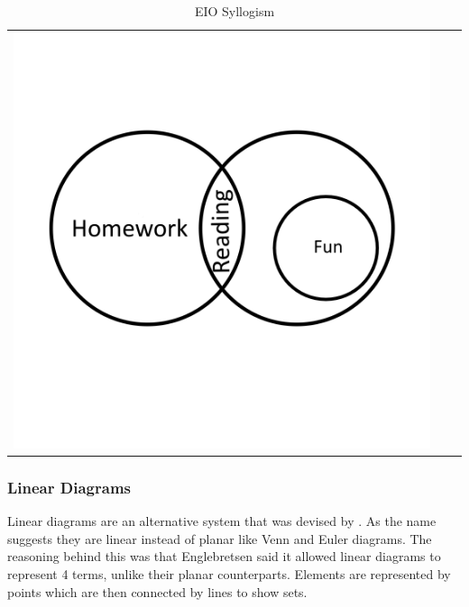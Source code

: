 \documentclass[12pt,a4paper]{report}
\begin{document}
\begin{table}[h!]
\begin{tabular}{  c  c  c }
\begin{minipage}{.22\textwidth}
      \includegraphics[width=\textwidth]{EulerSomeReadingIsNotFun3}
    \end{minipage}
    \\
  \end{tabular}
  \caption{EIO Syllogism}\label{tbl:eulerHomework}
\end{table}
\FloatBarrier


\subsubsection{Linear Diagrams}
Linear diagrams are an alternative system that was devised by \cite{englebretsen1991}. As the name suggests they are linear instead of planar like Venn and Euler diagrams. The reasoning behind this was that Englebretsen said it allowed linear diagrams to represent 4 terms, unlike their planar counterparts. Elements are represented by points which are then connected by lines to show sets.
\end{document}
